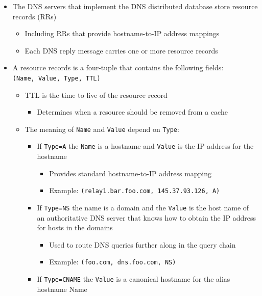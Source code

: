 \documentclass[11pt]{article}
\providecommand{\tightlist}{%
      \setlength{\itemsep}{0pt}\setlength{\parskip}{0pt}}
\begin{document}
\begin{itemize}
\tightlist
\item
  The DNS servers that implement the DNS distributed database store
  resource records (RRs)

  \begin{itemize}
  \tightlist
  \item
    Including RRs that provide hostname-to-IP address mappings
  \item
    Each DNS reply message carries one or more resource records
  \end{itemize}
\item
  A resource records is a four-tuple that contains the following fields:
  \texttt{(Name,\ Value,\ Type,\ TTL)}

  \begin{itemize}
  \tightlist
  \item
    TTL is the time to live of the resource record

    \begin{itemize}
    \tightlist
    \item
      Determines when a resource should be removed from a cache
    \end{itemize}
  \item
    The meaning of \texttt{Name} and \texttt{Value} depend on
    \texttt{Type}:

    \begin{itemize}
    \tightlist
    \item
      If \texttt{Type=A} the \texttt{Name} is a hostname and
      \texttt{Value} is the IP address for the hostname

      \begin{itemize}
      \tightlist
      \item
        Provides standard hostname-to-IP address mapping
      \item
        Example: \texttt{(relay1.bar.foo.com,\ 145.37.93.126,\ A)}
      \end{itemize}
    \item
      If \texttt{Type=NS} the name is a domain and the \texttt{Value} is
      the host name of an authoritative DNS server that knows how to
      obtain the IP address for hosts in the domains

      \begin{itemize}
      \tightlist
      \item
        Used to route DNS queries further along in the query chain
      \item
        Example: \texttt{(foo.com,\ dns.foo.com,\ NS)}
      \end{itemize}
    \item
      If \texttt{Type=CNAME} the \texttt{Value} is a canonical hostname
      for the alias hostname Name


\end{itemize}
\end{itemize}
\end{itemize}
\end{document}

